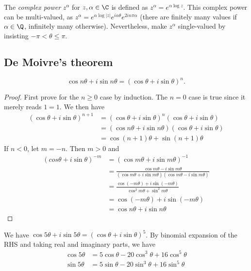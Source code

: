 \documentclass[a4paper]{article}
\begin{document}
\begin{defi}
  The \emph{complex power} $z^\alpha$ for $z, \alpha\in \C$ is defined as $z^\alpha = e^{\alpha\log z}$. This complex power can be multi-valued, as $z^\alpha = e^{\alpha\log|z|}e^{i\alpha\theta}e^{2in\pi\alpha}$ (there are finitely many values if $\alpha\in\Q$, infinitely many otherwise). Nevertheless, make $z^\alpha$ single-valued by insisting $-\pi < \theta \leq \pi$.
\end{defi}

\subsection{De Moivre's theorem}
\begin{thm}
\[
\cos n\theta + i\sin n\theta = (\cos\theta + i\sin\theta)^n.
\]
\end{thm}
\begin{proof}
  First prove for the $n \geq 0$ case by induction. The $n = 0$ case is true since it merely reads $1 = 1$. We then have
  \begin{align*}
    (\cos\theta + i\sin\theta)^{n + 1} &= (\cos\theta + i\sin\theta)^n (\cos\theta + i\sin\theta)\\
    &= (\cos n\theta + i\sin n\theta )(\cos\theta + i\sin\theta)\\
    &= \cos(n+1)\theta + \sin(n+1)\theta
  \end{align*}
  If $n < 0$, let $m = -n$. Then $m > 0$ and
  \begin{align*}
    (cos\theta + i\sin\theta)^{-m} &= (\cos m\theta + i\sin m\theta)^{-1}\\
    &= \frac{\cos m\theta - i\sin m\theta}{(\cos m\theta + i\sin m\theta)(\cos m\theta - i\sin m\theta)}\\
    &= \frac{\cos (-m\theta) + i\sin (-m\theta)}{\cos^2 m\theta + \sin^2 m\theta}\\
    &= \cos (-m\theta) + i\sin (-m\theta)\\
    &= \cos n\theta + i\sin n\theta
  \end{align*}
\end{proof}

\begin{eg}
  We have $\cos 5\theta + i\sin5\theta  = (\cos\theta + i\sin\theta)^5$. By binomial expansion of the RHS and taking real and imaginary parts, we have
  \begin{align*}
    \cos 5\theta &= 5\cos\theta - 20\cos^3\theta + 16\cos^5\theta\\
    \sin 5\theta &= 5\sin\theta - 20\sin^3\theta + 16\sin^5\theta
  \end{align*}
\end{eg}
\end{document}
